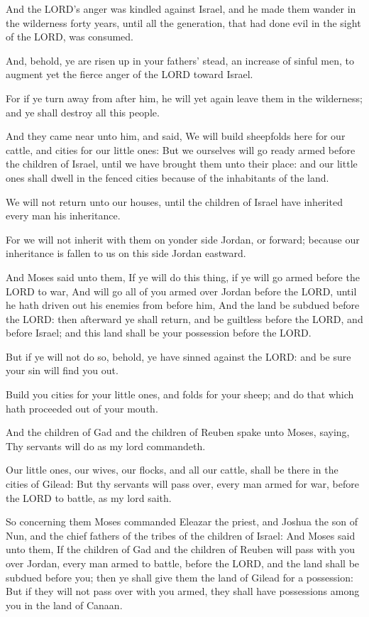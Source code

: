 \Verse And the LORD's anger was kindled against Israel, and he made
them wander in the wilderness forty years, until all the generation,
that had done evil in the sight of the LORD, was consumed.

\Verse And, behold, ye are risen up in your fathers' stead, an increase
of sinful men, to augment yet the fierce anger of the LORD toward
Israel.

\Verse For if ye turn away from after him, he will yet again leave them
in the wilderness; and ye shall destroy all this people.

\Verse And they came near unto him, and said, We will build sheepfolds
here for our cattle, and cities for our little ones: \Verse But we
ourselves will go ready armed before the children of Israel, until we
have brought them unto their place: and our little ones shall dwell in
the fenced cities because of the inhabitants of the land.

\Verse We will not return unto our houses, until the children of Israel
have inherited every man his inheritance.

\Verse For we will not inherit with them on yonder side Jordan, or
forward; because our inheritance is fallen to us on this side Jordan
eastward.

\Verse And Moses said unto them, If ye will do this thing, if ye will
go armed before the LORD to war, \Verse And will go all of you armed
over Jordan before the LORD, until he hath driven out his enemies from
before him, \Verse And the land be subdued before the LORD: then
afterward ye shall return, and be guiltless before the LORD, and
before Israel; and this land shall be your possession before the LORD.

\Verse But if ye will not do so, behold, ye have sinned against the
LORD: and be sure your sin will find you out.

\Verse Build you cities for your little ones, and folds for your sheep;
and do that which hath proceeded out of your mouth.

\Verse And the children of Gad and the children of Reuben spake unto
Moses, saying, Thy servants will do as my lord commandeth.

\Verse Our little ones, our wives, our flocks, and all our cattle,
shall be there in the cities of Gilead: \Verse But thy servants will
pass over, every man armed for war, before the LORD to battle, as my
lord saith.

\Verse So concerning them Moses commanded Eleazar the priest, and
Joshua the son of Nun, and the chief fathers of the tribes of the
children of Israel: \Verse And Moses said unto them, If the children of
Gad and the children of Reuben will pass with you over Jordan, every
man armed to battle, before the LORD, and the land shall be subdued
before you; then ye shall give them the land of Gilead for a
possession: \Verse But if they will not pass over with you armed, they
shall have possessions among you in the land of Canaan.

